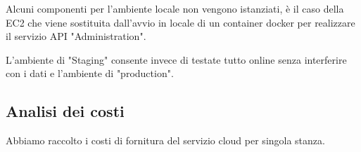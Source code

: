 Alcuni componenti per l'ambiente locale non vengono istanziati, è il caso della EC2 che viene sostituita dall'avvio in locale di un container docker per realizzare il servizio API "Administration".

L'ambiente di "Staging" consente invece di testate tutto online senza interferire con i dati e l'ambiente di "production".

\subsection{Analisi dei costi}

Abbiamo raccolto i costi di fornitura del servizio cloud per singola stanza.


\newpage